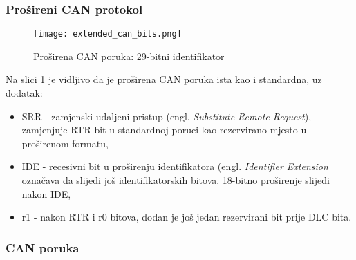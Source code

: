 \subsubsection{Prošireni CAN protokol}

\begin{figure}[H]
	\centering
	\texttt{[image: extended\_can\_bits.png]}
	\caption{Proširena CAN poruka: 29-bitni identifikator \cite[str. 4]{can_manual}}
	\label{fig:extended_can_bits}
\end{figure}
Na slici \ref{fig:extended_can_bits} je vidljivo da je proširena CAN poruka ista kao i standardna, uz dodatak:
\begin{itemize}
	\item SRR - zamjenski udaljeni pristup (engl. \textit{Substitute Remote Request}), zamjenjuje RTR bit u standardnoj poruci kao rezervirano mjesto u proširenom formatu,
	\item IDE - recesivni bit u proširenju identifikatora (engl. \textit{Identifier Extension} označava da slijedi još identifikatorskih bitova. 18-bitno proširenje slijedi nakon IDE,
	\item r1 - nakon RTR i r0 bitova, dodan je još jedan rezervirani bit prije DLC bita.
\end{itemize}

\subsubsection{CAN poruka}